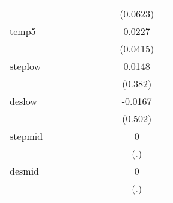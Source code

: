 {\begin{tabular}{l*{9}{c}}
            &                     &                     &                     &                     &                     &                     &                     &    (0.0623)         &                     \\
[1em]
temp5       &                     &                     &                     &                     &                     &                     &                     &      0.0227         &                     \\
            &                     &                     &                     &                     &                     &                     &                     &    (0.0415)         &                     \\
[1em]
steplow     &                     &                     &                     &                     &                     &                     &                     &      0.0148         &                     \\
            &                     &                     &                     &                     &                     &                     &                     &     (0.382)         &                     \\
[1em]
deslow      &                     &                     &                     &                     &                     &                     &                     &     -0.0167         &                     \\
            &                     &                     &                     &                     &                     &                     &                     &     (0.502)         &                     \\
[1em]
stepmid     &                     &                     &                     &                     &                     &                     &                     &           0         &                     \\
            &                     &                     &                     &                     &                     &                     &                     &         (.)         &                     \\
[1em]
desmid      &                     &                     &                     &                     &                     &                     &                     &           0         &                     \\
            &                     &                     &                     &                     &                     &                     &                     &         (.)         &                     \\

\end{tabular}}
